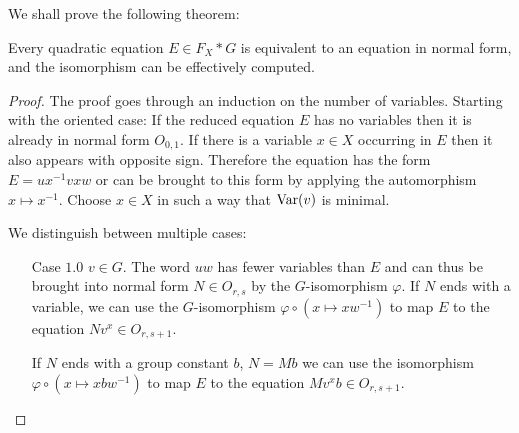 \documentclass[a4paper,11pt]{amsart}
\begin{document}
We shall prove the following theorem:
\begin{thm} \label{Thm:equationNormalForm}
  Every quadratic equation $E \in F_X*G$ is equivalent to an equation
  in normal form, and the isomorphism can be effectively computed.
\end{thm}

\begin{proof}
  The proof goes through an induction on the number of variables.
  Starting with the oriented case: If the reduced equation $E$ has no
  variables then it is already in normal form $O_{0,1}$. If there is a
  variable $x\in X$ occurring in $E$ then it also appears with
  opposite sign.  Therefore the equation has the form
  $E = ux^{-1}vxw$ or can be brought to this form by applying the
  automorphism $x \mapsto x^{-1}$. Choose $x\in X$ in such a way that
  $\textup{Var}(v)$ is minimal.
 
  We distinguish between multiple cases:
  \begin{itemize}
  \item[Case $1.0$] $v\in G$. The word $uw$ has fewer variables than
    $E$ and can thus be brought into normal form $N\in O_{r,s}$ by the
    $G$-isomorphism $\varphi$. If $N$ ends with a variable, we can use
    the $G$-isomorphism $\varphi \circ (x\mapsto xw^{-1}) $ to map $E$
    to the equation $Nv^x \in O_{r,s+1}$.
    
    If $N$ ends with a group constant $b$, $N=Mb$ we can use the
    isomorphism $\varphi \circ(x \mapsto xbw^{-1}) $ to map $E$ to the
    equation $Mv^xb\in O_{r,s+1}$.


\end{itemize}
\end{proof}
\end{document}
